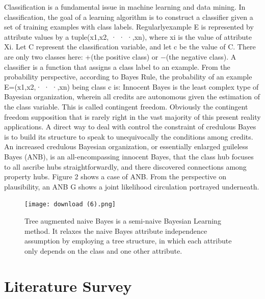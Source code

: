 \documentclass[letterpaper,12pt]{article}
\begin{document}
Classification is a fundamental issue in machine learning and data mining. In classification, the goal of a learning
algorithm is to construct a classifier given a set of training examples with class labels. Regularlyexample E is represented by attribute values by a tuple(x1,x2, · · ·,xn), where xi is the value of attribute Xi. Let C represent the classification variable, and let c be the value of C. There are only two classes here: +(the positive class) or −(the negative class). A classifier is a function that assigns a class label to an example. From the probability perspective, according to Bayes Rule, the probability of an example E=(x1,x2,· · ·,xn) being class c is:
Innocent Bayes is the least complex type of Bayesian organization, wherein all credits are autonomous given the estimation of the class variable. This is called contingent freedom. Obviously the contingent freedom supposition that is rarely right in the vast majority of this present reality applications. A direct way to deal with control the constraint of credulous Bayes is to build its structure to speak to unequivocally the conditions among credits. An increased credulous Bayesian organization, or essentially enlarged guileless Bayes (ANB), is an all-encompassing innocent Bayes, that the class hub focuses to all ascribe hubs straightforwardly, and there discovered connections among property hubs. Figure 2 shows a case of ANB. From the perspective on plausibility, an ANB G shows a joint likelihood circulation portrayed underneath.

\begin{figure}[!h]
    \centering
    \texttt{[image: download (6).png]}
    \caption{Tree augmented naive Bayes is a semi-naive Bayesian Learning method. It relaxes the naive Bayes attribute independence assumption by employing a tree structure, in which each attribute only depends on the class and one other attribute.}
\end{figure}


\section{Literature Survey}
\end{document}
